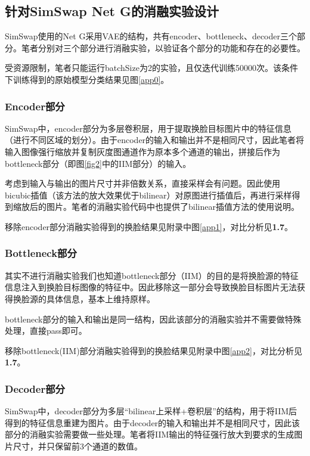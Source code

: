 \documentclass[a4paper]{article}
\begin{document}
\subsection{针对SimSwap Net G的消融实验设计}

SimSwap使用的Net G采用VAE的结构，共有encoder、bottleneck、decoder三个部分。笔者分别对三个部分进行消融实验，以验证各个部分的功能和存在的必要性。

受资源限制，笔者只能运行batchSize为2的实验，且仅迭代训练50000次。该条件下训练得到的原始模型分类结果见图\ref{app0}。

\subsubsection{Encoder部分}

SimSwap中，encoder部分为多层卷积层，用于提取换脸目标图片中的特征信息（进行不同区域的划分）。由于encoder的输入和输出并不是相同尺寸，因此笔者将输入图像强行缩放并复制灰度图通道作为原本多个通道的输出，拼接后作为bottleneck部分（即图\ref{fig2}中的IIM部分）的输入。

考虑到输入与输出的图片尺寸并非倍数关系，直接采样会有问题。因此使用bicubic插值（该方法的放大效果优于bilinear）\cite{AI2619}对原图进行插值后，再进行采样得到缩放后的图片。笔者的消融实验代码中也提供了bilinear插值方法的使用说明。

移除encoder部分消融实验得到的换脸结果见附录中图\ref{app1}，对比分析见\textbf{1.7}。

\subsubsection{Bottleneck部分}

其实不进行消融实验我们也知道bottleneck部分（IIM）的目的是将换脸源的特征信息注入到换脸目标图像的特征中。因此移除这一部分会导致换脸目标图片无法获得换脸源的具体信息，基本上维持原样。

bottleneck部分的输入和输出是同一结构，因此该部分的消融实验并不需要做特殊处理，直接pass即可。

移除bottleneck(IIM)部分消融实验得到的换脸结果见附录中图\ref{app2}，对比分析见\textbf{1.7}。

\subsubsection{Decoder部分}
SimSwap中，decoder部分为多层“bilinear上采样+卷积层”的结构，用于将IIM后得到的特征信息重建为图片。由于decoder的输入和输出并不是相同尺寸，因此该部分的消融实验需要做一些处理。笔者将IIM输出的特征强行放大到要求的生成图片尺寸，并只保留前3个通道的数值。
\end{document}
